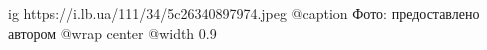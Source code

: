  
 
 
 
 

\ifcmt
  ig https://i.lb.ua/111/34/5c26340897974.jpeg
	@caption Фото: предоставлено автором
  @wrap center
  @width 0.9
\fi
